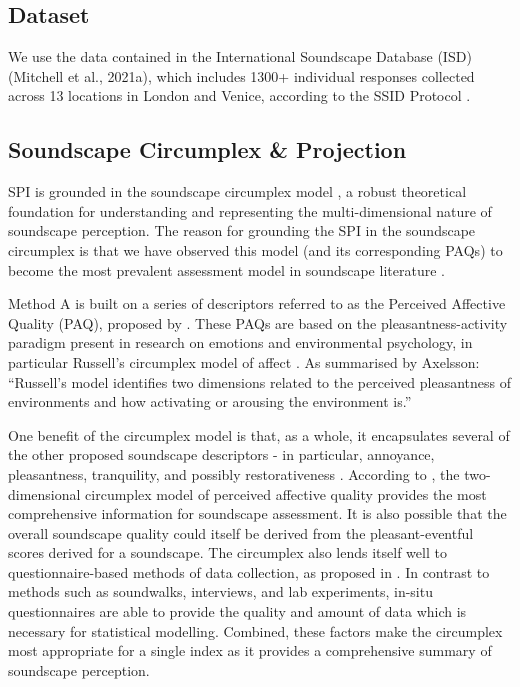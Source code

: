 \documentclass[
  authoryear,
  preprint,
  3p]{elsarticle}
\begin{document}
\subsection{Dataset}\label{dataset}

We use the data contained in the International Soundscape Database (ISD)
(Mitchell et al., 2021a), which includes 1300+ individual responses
collected across 13 locations in London and Venice, according to the
SSID Protocol \citet{Mitchell2020Soundscape}.

\subsection{Soundscape Circumplex \&
Projection}\label{soundscape-circumplex-projection}

SPI is grounded in the soundscape circumplex model
\citep{Axelsson2010principal, Axelsson2012Swedish}, a robust theoretical
foundation for understanding and representing the multi-dimensional
nature of soundscape perception. The reason for grounding the SPI in the
soundscape circumplex is that we have observed this model (and its
corresponding PAQs) to become the most prevalent assessment model in
soundscape literature \citep{Aletta2023Adoption}.

Method A is built on a series of descriptors referred to as the
Perceived Affective Quality (PAQ), proposed by
\citep{Axelsson2010principal}. These PAQs are based on the
pleasantness-activity paradigm present in research on emotions and
environmental psychology, in particular Russell's circumplex model of
affect \citep{Russell1980circumplex}. As summarised by Axelsson:
``Russell's model identifies two dimensions related to the perceived
pleasantness of environments and how activating or arousing the
environment is.''

One benefit of the circumplex model is that, as a whole, it encapsulates
several of the other proposed soundscape descriptors - in particular,
annoyance, pleasantness, tranquility, and possibly restorativeness
\citep{Aletta2016Soundscape}. According to \citet{Axelsson2015How}, the
two-dimensional circumplex model of perceived affective quality provides
the most comprehensive information for soundscape assessment. It is also
possible that the overall soundscape quality could itself be derived
from the pleasant-eventful scores derived for a soundscape. The
circumplex also lends itself well to questionnaire-based methods of data
collection, as proposed in \citet{ISO12913Part2}. In contrast to methods
such as soundwalks, interviews, and lab experiments, in-situ
questionnaires are able to provide the quality and amount of data which
is necessary for statistical modelling. Combined, these factors make the
circumplex most appropriate for a single index as it provides a
comprehensive summary of soundscape perception.
\end{document}
